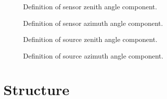\begin{figure}[htp]
  \centering
  
  \caption{Definition of \GeometryInfo{} sensor zenith angle component.}
  \label{fig:gInfo_sensor_zenith_angle}
\end{figure}

\begin{figure}[htp]
  \centering
  
  \caption{Definition of \GeometryInfo{} sensor azimuth angle component.}
  \label{fig:gInfo_sensor_azimuth_angle}
\end{figure}

\begin{figure}[htp]
  \centering
  
  \caption{Definition of \GeometryInfo{} source zenith angle component.}
  \label{fig:gInfo_source_zenith_angle}
\end{figure}

\begin{figure}[htp]
  \centering
  
  \caption{Definition of \GeometryInfo{} source azimuth angle component.}
  \label{fig:gInfo_source_azimuth_angle}
\end{figure}

\clearpage




\clearpage
\section{\RTSolution{} Structure}
\label{sec:rtsolution_structure}



